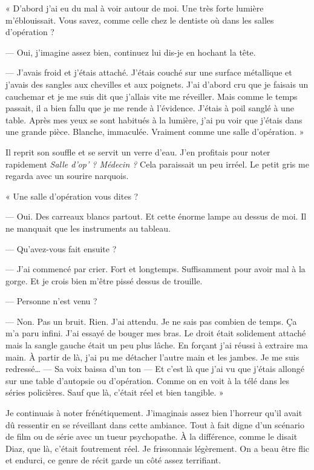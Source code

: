 « D'abord j'ai eu du mal à voir autour de moi. Une très forte lumière m'éblouissait. Vous savez, comme celle chez le
dentiste où dans les salles d'opération ?

— Oui, j'imagine assez bien, continuez lui dis-je en hochant la tête.

— J'avais froid et j'étais attaché. J'étais couché sur une surface métallique et j'avais des sangles aux chevilles et
aux poignets. J'ai d'abord cru que je faisais un cauchemar et je me suis dit que j'allais vite me réveiller. Mais comme
le temps passait, il a bien fallu que je me rende à l'évidence. J'étais à poil sanglé à une table. Après mes yeux se
sont habitués à la lumière, j'ai pu voir que j'étais dans une grande pièce. Blanche, immaculée. Vraiment comme une
salle d'opération. »

Il reprit son souffle et se servit un verre d'eau. J'en profitais pour noter rapidement \emph{Salle d'op' ? Médecin ?}
Cela paraissait un peu irréel. Le petit gris me regarda avec un sourire narquois.

« Une salle d'opération vous dites ?

— Oui. Des carreaux blancs partout. Et cette énorme lampe au dessus de moi. Il ne manquait que les instruments au
tableau.

— Qu'avez-vous fait ensuite ?

— J'ai commencé par crier. Fort et longtemps. Suffisamment pour avoir mal à la gorge. Et je crois bien m'être pissé
dessus de trouille.

— Personne n'est venu ?

— Non. Pas un bruit. Rien. J'ai attendu. Je ne sais pas combien de temps. Ça m'a paru infini. J'ai essayé de bouger mes
bras. Le droit était solidement attaché mais la sangle gauche était un peu plus lâche. En forçant j'ai réussi à
extraire ma main. À partir de là, j'ai pu me détacher l'autre main et les jambes. Je me suis redressé… — Sa voix baissa
d'un ton — Et c'est là que j'ai vu que j'étais allongé sur une table d'autopsie ou d'opération. Comme on en voit à la
télé dans les séries policières. Sauf que là, c'était réel et bien tangible. »

Je continuais à noter frénétiquement. J'imaginais assez bien l'horreur qu'il avait dû ressentir en se réveillant dans
cette ambiance. Tout à fait digne d'un scénario de film ou de série avec un tueur psychopathe. À la différence, comme
le disait Diaz, que là, c'était foutrement réel. Je frissonnais légèrement. On a beau être flic et endurci, ce genre de
récit garde un côté assez terrifiant.

